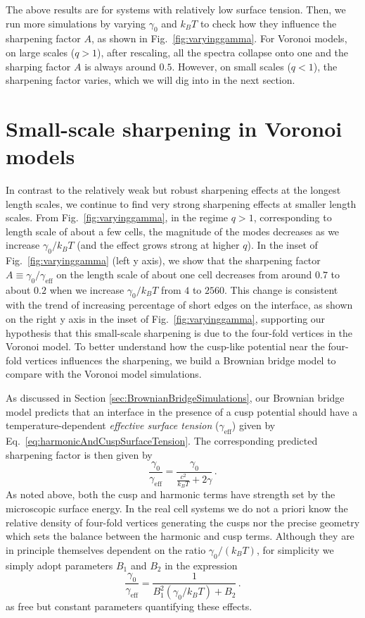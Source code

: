 \documentclass[twoside,twocolumn,9pt]{article}
\begin{document}
The above results are for systems with relatively low surface tension. Then, we run more simulations by varying $\gamma_0$ and $k_BT$ to check how they influence the sharpening factor $A$, as shown in Fig.~\ref{fig:varyinggamma}. For Voronoi models, on large scales ($q>1$), after rescaling, all the spectra collapse onto one and the sharping factor $A$ is always around $0.5$. However, on small scales ($q<1$), the sharpening factor varies, which we will dig into in the next section. 


\section{Small-scale sharpening in Voronoi models}
In contrast to the relatively weak but robust sharpening effects at the longest length scales, we continue to find very strong sharpening effects at smaller length scales. From Fig.~\ref{fig:varyinggamma}, in the regime $q>1$, corresponding to length scale of about a few cells, the magnitude of the modes decreases as we increase $\gamma_0/k_B T$ (and the effect grows strong at higher $q$). In the inset of Fig.~\ref{fig:varyinggamma} (left y axis), we show that the sharpening factor $A\equiv\gamma_0/\gamma_{\text{eff}}$ on the length scale of about one cell decreases from around $0.7$ to about $0.2$ when we increase $\gamma_0/k_BT$ from $4$ to $2560$. This change is consistent with the trend of increasing percentage of short edges on the interface, as shown on the right y axis in the inset of Fig.~\ref{fig:varyinggamma}, supporting our hypothesis that this small-scale sharpening is due to the four-fold vertices in the Voronoi model. To better understand how the cusp-like potential near the four-fold vertices influences the sharpening, we build a Brownian bridge model to compare with the Voronoi model simulations.

As discussed in Section \ref{sec:BrownianBridgeSimulations}, our Brownian bridge model predicts that an interface in the presence of a cusp potential should have a temperature-dependent \textit{effective surface tension} ($\gamma_{\text{eff}}$) given by Eq.~\ref{eq:harmonicAndCuspSurfaceTension}. The corresponding predicted sharpening factor is then given by
\begin{equation}
    \label{eq:brownianBridgeSharpeningFactor}
    \frac{\gamma_{0}}{\gamma_{\text{eff}}} = \frac{\gamma_{0}}{\frac{c^{2}}{{k}_{B}T}+2\gamma}\,.
\end{equation}
As noted above, both the cusp and harmonic terms have strength set by the microscopic surface energy. In the real cell systems we do not a priori know the relative density of four-fold vertices generating the cusps nor the precise geometry which sets the balance between the harmonic and cusp terms. Although they are in principle themselves dependent on the ratio $\gamma_0/(k_BT)$, for simplicity we simply adopt parameters $B_{1}$ and $B_{2}$ in the expression
\begin{equation}\label{eq:brownianBridgeSharpeningFactorReduced}
    \frac{\gamma_{0}}{\gamma_{\text{eff}}} = \frac{1}{B_{1}^{2}(\gamma_{0}/{k}_{B}T)+B_{2}}\,.
\end{equation}
as free but constant parameters quantifying these effects. 
\end{document}
